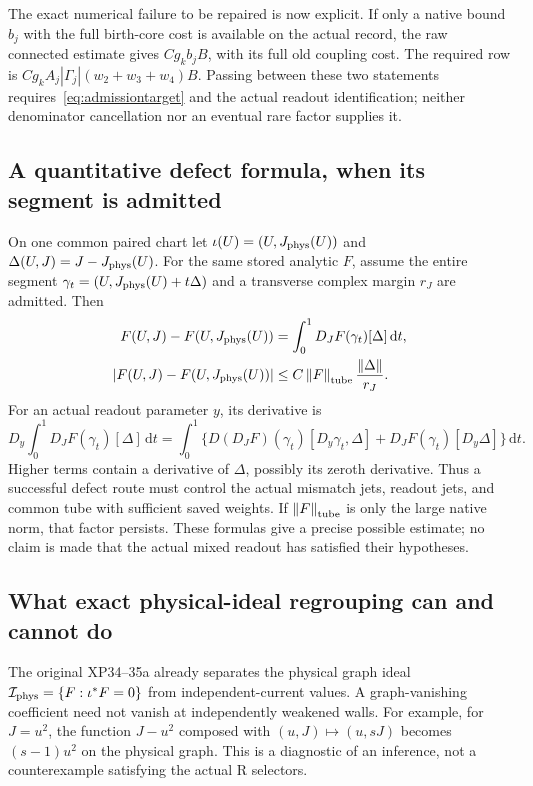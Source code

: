 \documentclass[11pt,letterpaper]{article}
\theoremstyle{plain}
\theoremstyle{remark}\newtheorem{remark}[theorem]{Scope}
\newcommand{\dd}{\,\mathrm d}\newcommand{\OH}{\mathcal O_H}
\newcommand{\norm}[1]{\left\lVert#1\right\rVert}
\begin{document}
The exact numerical failure to be repaired is now explicit. If only a
native bound $b_j$ with the full birth-core cost is available on the actual
record, the raw connected estimate gives
$C g_kb_jB$, with its full old coupling cost. The required row is
$C g_kA_j|\Gamma_j|(w_2+w_3+w_4)B$. Passing between these two statements
requires~\eqref{eq:admissiontarget} and the actual readout identification;
neither denominator cancellation nor an eventual rare factor supplies it.

\subsection{A quantitative defect formula, when its segment is admitted}

On one common paired chart let
$\iota(U)=(U,J_{\rm phys}(U))$ and
$\Delta(U,J)=J-J_{\rm phys}(U)$. For the same stored analytic $F$, assume
the entire segment $\gamma_t=(U,J_{\rm phys}(U)+t\Delta)$ and a transverse
complex margin $r_J$ are admitted. Then
\begin{align}
F(U,J)-F(U,J_{\rm phys}(U))
&=\int_0^1D_JF(\gamma_t)[\Delta]\dd t,\label{eq:Hadamard}\\
|F(U,J)-F(U,J_{\rm phys}(U))|
&\le C\norm F_{\rm tube}\frac{\norm\Delta}{r_J}.
\label{eq:Hadamardbound}
\end{align}
For an actual readout parameter $y$, its derivative is
\begin{equation}
D_y\!\int_0^1D_JF(\gamma_t)[\Delta]\dd t
=\int_0^1\{D(D_JF)(\gamma_t)[D_y\gamma_t,\Delta]
+D_JF(\gamma_t)[D_y\Delta]\}\dd t.
\label{eq:defectjet}
\end{equation}
Higher terms contain a derivative of $\Delta$, possibly its zeroth
derivative. Thus a successful defect route must control the actual mismatch
jets, readout jets, and common tube with sufficient saved weights. If
$\norm F_{\rm tube}$ is only the large native norm, that factor persists.
These formulas give a precise possible estimate; no claim is made that the
actual mixed readout has satisfied their hypotheses.

\subsection{What exact physical-ideal regrouping can and cannot do}

The original XP34--35a already separates the physical graph ideal
$\mathcal I_{\rm phys}=\{F:\iota^*F=0\}$ from independent-current values.
A graph-vanishing coefficient need not vanish at independently weakened
walls. For example, for $J=u^2$, the function $J-u^2$ composed with
$(u,J)\mapsto(u,sJ)$ becomes $(s-1)u^2$ on the physical graph.
This is a diagnostic of an inference, not a counterexample satisfying the
actual R selectors.
\end{document}
